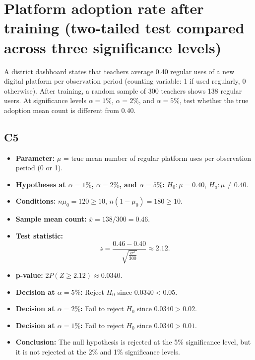 
\begin{center}
\end{center}


\begin{center}
\end{center}


\section{Platform adoption rate after training (two-tailed test compared across three significance levels)}
A district dashboard states that teachers average 0.40 regular uses of a new digital platform per observation period (counting variable: 1 if used regularly, 0 otherwise). After training, a random sample of 300 teachers shows 138 regular users. At significance levels \(\alpha=1\%\), \(\alpha=2\%\), and \(\alpha=5\%\), test whether the true adoption mean count is different from 0.40.

\subsection*{C5}
\begin{itemize}
	\item \textbf{Parameter:} \(\mu\) = true mean number of regular platform uses per observation period (0 or 1).
	\item \textbf{Hypotheses at \(\alpha=1\%\), \(\alpha=2\%\), and \(\alpha=5\%\):} \(H_0\colon \mu=0.40\), \(H_a\colon \mu\ne0.40\).
	\item \textbf{Conditions:} \(n\mu_0=120\ge10\), \(n(1-\mu_0)=180\ge10\).
	\item \textbf{Sample mean count:} \(\bar x=138/300=0.46\).
	\item \textbf{Test statistic:}
	\[
	z=\frac{0.46-0.40}{\sqrt{\frac{\sigma^2}{300}}}\approx 2.12.
	\]
	\item \textbf{p-value:} \(2P(Z\ge 2.12)\approx 0.0340\).
	\item \textbf{Decision at \(\alpha=5\%\):} Reject \(H_0\) since \(0.0340<0.05\).
	\item \textbf{Decision at \(\alpha=2\%\):} Fail to reject \(H_0\) since \(0.0340>0.02\).
	\item \textbf{Decision at \(\alpha=1\%\):} Fail to reject \(H_0\) since \(0.0340>0.01\).
	\item \textbf{Conclusion:} The null hypothesis is rejected at the 5\% significance level, but it is not rejected at the 2\% and 1\% significance levels.
\end{itemize}

